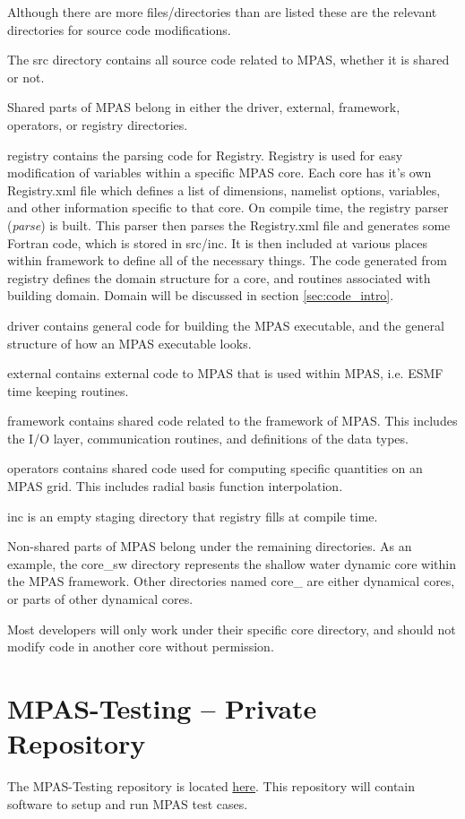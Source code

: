 \documentclass[11pt]{report}
\begin{document}
Although there are more files/directories than are listed these are the
relevant directories for source code modifications.

The src directory contains all source code related to MPAS, whether it is shared
or not.

Shared parts of MPAS belong in either the driver, external, framework,
operators, or registry directories.

registry contains the parsing code for Registry. Registry is used for easy
modification of variables within a specific MPAS core. Each core has it's own
Registry.xml file which defines a list of dimensions, namelist options,
variables, and other information specific to that core. On compile time, the
registry parser ({\it parse}) is built. This parser then parses the Registry.xml file
and generates some Fortran code, which is stored in src/inc. It is then
included at various places within framework to define all of the necessary
things. The code generated from registry defines the domain structure for a
core, and routines associated with building domain. Domain will be discussed in
section \ref{sec:code_intro}.

driver contains general code for building the MPAS executable, and the general
structure of how an MPAS executable looks.

external contains external code to MPAS that is used within MPAS, i.e. ESMF
time keeping routines.

framework contains shared code related to the framework of MPAS. This includes
the I/O layer, communication routines, and definitions of the data types.

operators contains shared code used for computing specific quantities on an
MPAS grid. This includes radial basis function interpolation.

inc is an empty staging directory that registry fills at compile time.

Non-shared parts of MPAS belong under the remaining directories. As an example,
the core\_sw directory represents the shallow water dynamic core within the
MPAS framework. Other directories named core\_ are either dynamical cores, or
parts of other dynamical cores.

Most developers will only work under their specific core directory, and should
not modify code in another core without permission.

\section{MPAS-Testing -- Private Repository}
The MPAS-Testing repository is located 
\href{https://github.com/MPAS-Dev/MPAS-Testing}{here}. This repository will
contain software to setup and run MPAS test cases.
\end{document}
